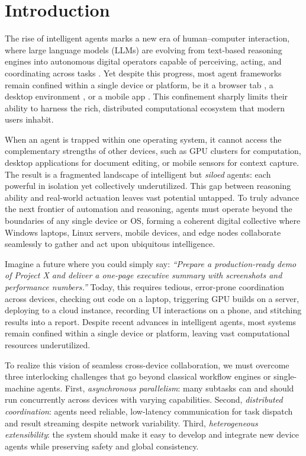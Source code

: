 \documentclass[10pt]{article} %
\begin{document}
\section{Introduction}
The rise of intelligent agents \cite{wang2024survey} marks a new era of human–computer interaction, where large language models (LLMs) \cite{naveed2025comprehensive} are evolving from text-based reasoning engines \cite{qu2025tool} into autonomous digital operators capable of perceiving, acting, and coordinating across tasks \cite{zhang2024large}. Yet despite this progress, most agent frameworks remain confined within a single device or platform, be it a browser tab \cite{ning2025survey, zheng2024gpt}, a desktop environment \cite{zhang2025ufo, zhang2025ufo2}, or a mobile app \cite{zhang2025appagent, wang2024mobile}. This confinement sharply limits their ability to harness the rich, distributed computational ecosystem that modern users inhabit. 

When an agent is trapped within one operating system, it cannot access the complementary strengths of other devices, such as GPU clusters for computation, desktop applications for document editing, or mobile sensors for context capture. The result is a fragmented landscape of intelligent but \emph{siloed} agents: each powerful in isolation yet collectively underutilized. This gap between reasoning ability and real-world actuation leaves vast potential untapped. To truly advance the next frontier of automation and reasoning, agents must operate beyond the boundaries of any single device or OS, forming a coherent digital collective where Windows laptops, Linux servers, mobile devices, and edge nodes collaborate seamlessly \cite{houben2017opportunities, brudy2019cross} to gather and act upon ubiquitous intelligence.

Imagine a future where you could simply say: \emph{``Prepare a production-ready demo of Project X and deliver a one-page executive summary with screenshots and performance numbers.''} Today, this requires tedious, error-prone coordination across devices, checking out code on a laptop, triggering GPU builds on a server, deploying to a cloud instance, recording UI interactions on a phone, and stitching results into a report. Despite recent advances in intelligent agents, most systems remain confined within a single device or platform, leaving vast computational resources underutilized.

To realize this vision of seamless cross-device collaboration, we must overcome three interlocking challenges that go beyond classical workflow engines or single-machine agents. First, \emph{asynchronous parallelism}: many subtasks can and should run concurrently across devices with varying capabilities. Second, \emph{distributed coordination}: agents need reliable, low-latency communication for task dispatch and result streaming despite network variability. Third, \emph{heterogeneous extensibility}: the system should make it easy to develop and integrate new device agents while preserving safety and global consistency.
\end{document}
